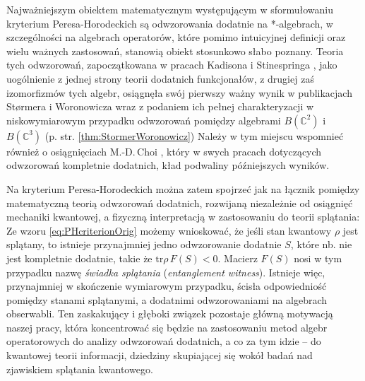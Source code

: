 Najważniejszym obiektem matematycznym występującym w sformułowaniu
kryterium Peresa-Horodeckich są odwzorowania dodatnie na *-algebrach,
w szczególności na algebrach operatorów,
które pomimo intuicyjnej definicji oraz wielu ważnych zastosowań,
stanowią obiekt stosunkowo słabo poznany.
Teoria tych odwzorowań, zapoczątkowana w pracach Kadisona
\cite{kadison1952generalized}
i Stinespringa
\cite{stinespring1955positive},
jako uogólnienie z jednej strony teorii dodatnich funkcjonałów,
z drugiej zaś izomorfizmów tych algebr,
osiągnęła swój pierwszy ważny wynik w publikacjach Størmera i Woronowicza
\cite{stormer1963positive,woronowicz1976positive}
wraz z podaniem ich pełnej charakteryzacji w niskowymiarowym przypadku
odwzorowań pomiędzy algebrami $B(\mathbb{C}^{2})$ i $B(\mathbb{C}^{3})$
(p. str. \ref{thm:StormerWoronowicz})
Należy w tym miejscu wspomnieć również o osiągnięciach M.-D.\,Choi
\cite{choi1975positive,choi1975completely,choi1977extremal},
który w swych pracach dotyczących odwzorowań kompletnie dodatnich,
kład podwaliny późniejszych wyników.

Na kryterium Peresa-Horodeckich można zatem spojrzeć jak na łącznik pomiędzy
matematyczną teorią odwzorowań dodatnich,
rozwijaną niezależnie od osiągnięć mechaniki kwantowej,
a fizyczną interpretacją w zastosowaniu do teorii splątania:
Ze wzoru \eqref{eq:PHcriterionOrig} możemy wnioskować,
że jeśli stan kwantowy $\rho$ jest splątany,
to istnieje przynajmniej jedno odwzorowanie dodatnie $S$,
które nb. nie jest kompletnie dodatnie,
takie że $\text{tr} \rho \, F(S) < 0$.
Macierz $F(S)$ nosi w tym przypadku nazwę
\emph{świadka splątania} (\emph{entanglement witness}).
Istnieje więc,
przynajmniej w skończenie wymiarowym przypadku,
ścisła odpowiedniość pomiędzy stanami splątanymi,
a dodatnimi odwzorowaniami na algebrach obserwabli.
Ten zaskakujący i głęboki związek pozostaje główną motywacją naszej pracy,
która koncentrować się będzie na zastosowaniu metod algebr operatorowych
do analizy odwzorowań dodatnich,
a co za tym idzie -- do kwantowej teorii informacji,
dziedziny skupiającej się wokół badań nad zjawiskiem splątania kwantowego.


